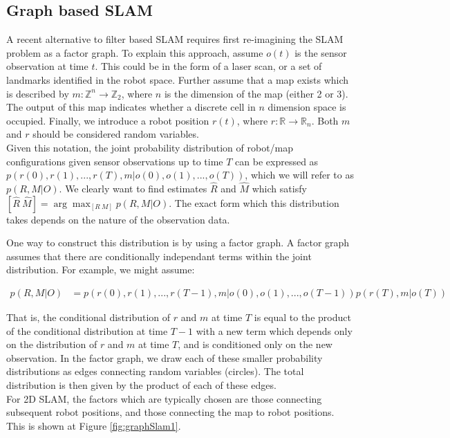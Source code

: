 \documentclass[capstone_report.tex]{subfiles}
\begin{document}
\subsection{Graph based SLAM}
A recent alternative to filter based SLAM requires first re-imagining the SLAM problem as a factor graph. To explain this approach, assume $o(t)$ is the sensor observation at time $t$. This could be in the form of a laser scan, or a set of landmarks identified in the robot space. Further assume that a map exists which is described by $m:\mathbb Z^n\to\mathbb Z_2$, where $n$ is the dimension of the map (either 2 or 3). The output of this map indicates whether a discrete cell in $n$ dimension space is occupied. Finally, we introduce a robot position $r(t)$, where $r:\mathbb R\to\mathbb R_n$. Both $m$ and $r$ should be considered random variables.\\

Given this notation, the joint probability distribution of robot/map configurations given sensor observations up to time $T$ can be expressed as $p(r(0), r(1), ... , r(T), m | o(0), o(1), ... , o(T))$, which we will refer to as $p(R,M|O)$. We clearly want to find estimates $\hat{R}$ and $\hat{M}$ which satisfy $[\hat{R} \ \hat{M}] = \arg \max_{[R \  M]} p(R,M|O)$. The exact form which this distribution takes depends on the nature of the observation data.

One way to construct this distribution is by using a factor graph. A factor graph assumes that there are conditionally independant terms within the joint distribution. For example, we might assume:

\begin{align*}
  p(R,M|O)&= p(r(0), r(1), ... , r(T-1), m | o(0), o(1), ... , o(T-1))p(r(T), m | o(T))
\end{align*}

That is, the conditional distribution of $r$ and $m$ at time $T$ is equal to the product of the conditional distribution at time $T-1$ with a new term which depends only on the distribution of $r$ and $m$ at time $T$, and is conditioned only on the new observation. In the factor graph, we draw each of these smaller probability distributions as edges connecting random variables (circles). The total distribution is then given by the product of each of these edges.\\ 

For 2D SLAM, the factors which are typically chosen are those connecting subsequent robot positions, and those connecting the map to robot positions. This is shown at Figure \ref{fig:graphSlam1}.
\end{document}
